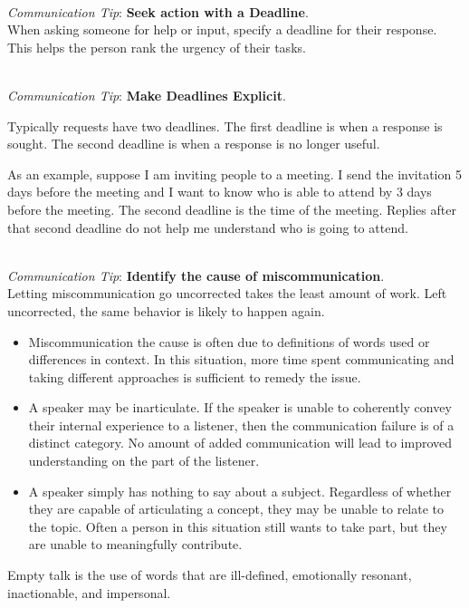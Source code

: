 \ \\
\textit{Communication Tip}: \textbf{Seek action with a Deadline}.\\
When asking someone for help or input, specify a deadline for their response. 
This helps the person rank the urgency of their tasks.

\ \\
\textit{Communication Tip}: \textbf{Make Deadlines Explicit}.

Typically requests have two deadlines. The first deadline is when a response is sought. The second deadline is when a response is no longer useful.  

As an example, suppose I am inviting people to a meeting. I send the invitation 5 days before the meeting and I want to know who is able to attend by 3 days before the meeting. The second deadline is the time of the meeting. Replies after that second deadline do not help me understand who is going to attend. 

\ \\
\textit{Communication Tip}: \textbf{Identify the cause of miscommunication}.\\
Letting miscommunication go uncorrected takes the least amount of work. Left uncorrected, the same behavior is likely to happen again. 

\begin{itemize}
    \item Miscommunication the cause is often due to definitions of words used or differences in context. In this situation, more time spent communicating and taking different approaches is sufficient to remedy the issue.
\item A speaker may be inarticulate. If the speaker is unable to coherently convey their internal experience to a listener, then the communication failure is of a distinct category. No amount of added communication will lead to improved understanding on the part of the listener.
\item A speaker simply has nothing to say about a subject. Regardless of whether they are capable of articulating a concept, they may be unable to relate to the topic. Often a person in this situation still wants to take part, but they are unable to meaningfully contribute. 
\end{itemize}
Empty talk is the use of words that are ill-defined, emotionally resonant, inactionable, and impersonal.

